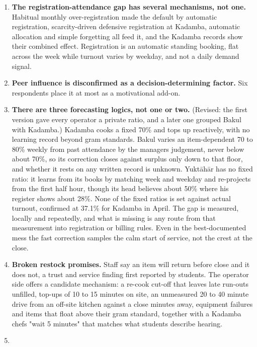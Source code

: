 \documentclass[
  10pt,
  table]{article}
\providecommand{\tightlist}{%
  \setlength{\itemsep}{0pt}\setlength{\parskip}{0pt}}
\renewcommand{\tightlist}{\setlength{\itemsep}{1.5pt}\setlength{\parskip}{0pt}}
\begin{document}
\begin{enumerate}
\def\labelenumi{\arabic{enumi}.}
\tightlist
\item
  \textbf{The registration-attendance gap has several mechanisms, not one.} Habitual monthly over-registration made the default by automatic registration, scarcity-driven defensive registration at Kadamba, automatic allocation and simple forgetting all feed it, and the Kadamba records show their combined effect. Registration is an automatic standing booking, flat across the week while turnout varies by weekday, and not a daily demand signal.
\item
  \textbf{Peer influence is disconfirmed as a decision-determining factor.} Six respondents place it at most as a motivational add-on.
\item
  \textbf{There are three forecasting logics, not one or two.} (Revised: the first version gave every operator a private ratio, and a later one grouped Bakul with Kadamba.) Kadamba cooks a fixed 70\% and tops up reactively, with no learning record beyond gram standards. Bakul varies an item-dependent 70 to 80\% weekly from past attendance by the manager\textquotesingle s judgement, never below about 70\%, so its correction closes against surplus only down to that floor, and whether it rests on any written record is unknown. Yuktāhār has no fixed ratio: it learns from its books by matching week and weekday and re-projects from the first half hour, though its head believes about 50\% where his register shows about 28\%. None of the fixed ratios is set against actual turnout, confirmed at 37.1\% for Kadamba in April. The gap is measured, locally and repeatedly, and what is missing is any route from that measurement into registration or billing rules. Even in the best-documented mess the fast correction samples the calm start of service, not the crest at the close.
\item
  \textbf{Broken restock promises.} Staff say an item will return before close and it does not, a trust and service finding first reported by students. The operator side offers a candidate mechanism: a re-cook cut-off that leaves late run-outs unfilled, top-ups of 10 to 15 minutes on site, an unmeasured 20 to 40 minute drive from an off-site kitchen against a close minutes away, equipment failures and items that float above their gram standard, together with a Kadamba chef\textquotesingle s "wait 5 minutes" that matches what students describe hearing.
\item

\end{enumerate}
\end{document}
